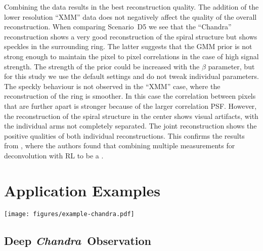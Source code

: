 \documentclass[twocolumn]{aastex631}
\newcommand{\chandra}{\textit{Chandra}~}
\newcommand{\jolideco}{\textit{Jolideco}~}
\begin{document}
    Combining the data results in the best reconstruction quality. The addition of the lower resolution \enquote{XMM} data does not negatively affect the quality of the overall reconstruction. When comparing Scenario~D5 we see that the \enquote{Chandra} reconstruction shows a very good reconstruction of the spiral structure but shows speckles in the surrounding ring. The latter suggests that the GMM prior is not strong enough to maintain the pixel to pixel correlations in the case of high signal strength. The strength of the prior could be increased with the $\beta$ parameter, but for this study we use the default settings and do not tweak individual parameters. The speckly behaviour is not observed in the \enquote{XMM} case, where the reconstruction of the ring is smoother. In this case the correlation between pixels that are further apart is stronger because of the larger correlation PSF. However, the reconstruction of the spiral structure in the center shows visual artifacts, with the individual arms not completely separated. The joint reconstruction shows the positive qualities of both individual reconstructions. This confirms the results from \cite{Ingaramo2014}, where the authors found that combining multiple measurements for deconvolution with RL to be a .

    \section{Application Examples}
    \begin{figure*}
        \begin{centering}
            \texttt{[image: figures/example-chandra.pdf]}
            \caption{
               \jolideco result for \chandra observations of SNR \textit{1E~0102.2–7219}. The bottom left image shows the summed counts from 25 observations. The bottom right image  shows the the \jolideco deconvolution. The flux is given as a counts rate relative to obsID 1308. The panels \textit{Zoom A}, \textit{Zoom B} and \textit{Zoom C} show a zoomed-in version of three example regions in the SNR, marked with the white rectangles in the large images. The colormap and scale used in the zoom insets is the same as used for the larger images.
            }
            \label{fig:example-chandra}
        \end{centering}
    \end{figure*}
    \subsection{Deep \chandra Observation}
    \label{sec:chandra-example}
\end{document}
